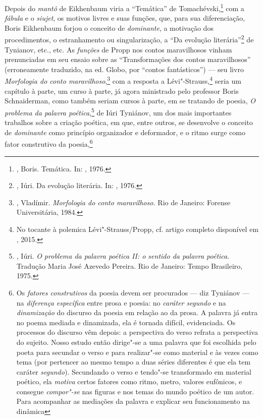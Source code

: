 {{{Depois do \emph{mantô} de Eikhenbaum viria a ``Temática'' de
Tomachévski,\footnote{, Boris. Temática. In:
 , 1976.} com a \emph{fábula} e o \emph{siujet}, os motivos livres e
suas funções, que, para sua diferenciação, Boris Eikhenbaum forjou o conceito
de \emph{dominante}, a motivação dos procedimentos, o estranhamento ou
singularização, a ``Da evolução literária''\footnote{, Iúri. Da evolução literária.
 In: , 1976.} de Tynianov, etc., etc. As
\emph{funções} de Propp nos contos maravilhosos vinham prenunciadas
em seu ensaio sobre as ``Transformações dos contos maravilhosos''
(erroneamente traduzido, na ed. Globo, por ``contos fantásticos'') --- seu livro
\emph{Morfologia do conto maravilhoso},\footnote{, 
Vladímir. \emph{Morfologia do conto maravilhoso.} Rio de Janeiro:
 Forense Universitária, 1984.} com a resposta a
Lévi"-Strauss,\footnote{No tocante à polemica Lévi"-Strauss/Propp,
 cf. artigo completo disponível em , 2015.} seria um capítulo à parte, um curso à
parte, já agora ministrado pelo professor Boris Schnaiderman, como também seriam cursos
à parte, em se tratando de poesia, \emph{O problema da palavra poética},\footnote{, Iúri. 
\emph{O problema da palavra poética II: o sentido da palavra poética}.
 Tradução Maria José Azevedo Pereira. Rio de Janeiro: Tempo Brasileiro,
 1975.}
de Iúri Tyniánov, um dos mais importantes trabalhos sobre a
criação poética, em que, entre outros, se desenvolve o conceito de
\emph{dominante} como princípio organizador e deformador, e o ritmo surge como
fator construtivo da poesia,\footnote{Os \emph{fatores 
construtivos} da poesia devem ser procurados --- diz Tyniánov --- na 
\emph{diferença específica} entre prosa e poesia: no \emph{caráter 
segundo} e na \emph{dinamização} do discurso da poesia em relação ao 
da prosa. A palavra já entra no poema mediada e dinamizada, ela é 
tornada difícil, evidenciada. Os processos do discurso vêm depois:
 a perspectiva do verso refrata a perspectiva do sujeito. Nosso estudo 
então dirige"-se a uma palavra que foi escolhida pelo poeta para 
secundar o verso e para realizar"-se como material e às vezes como
 tema (por pertencer ao mesmo tempo a duas séries diferentes é que
 ela tem caráter \emph{segundo}). Secundando o verso e tendo"-se
transformado em material poético, ela \emph{motiva} certos fatores 
como ritmo, metro, valores eufônicos, e consegue \emph{compor"-se} 
nas figuras e nos temas do mundo poético de um autor. Para acompanhar
 as mediações da palavra e explicar seu funcionamento na dinâmica
}}}}
